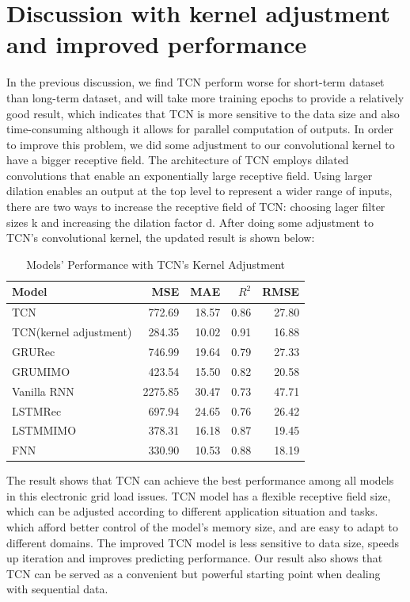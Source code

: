\section{Discussion with kernel adjustment and improved performance}
In the previous discussion, we find TCN perform worse for short-term dataset than long-term dataset, and will take more training epochs to provide a relatively good result, which indicates that TCN is more sensitive to the data size and also time-consuming although it allows for parallel computation of outputs. In order to improve this problem, we did some adjustment to our convolutional kernel to have a bigger receptive field. The architecture of TCN employs dilated convolutions that enable an exponentially large receptive field. Using larger dilation enables an output at the top level to represent a wider range of inputs, there are two ways to increase the receptive field of TCN: choosing lager filter sizes k and increasing the dilation factor d. After doing some adjustment to TCN's convolutional kernel, the updated result is shown below:

\begin{table}[H]
\centering
\caption{Models' Performance with TCN's Kernel Adjustment}
\begin{tabular}{l r r r r}
\toprule
\textbf{Model} & \textbf{MSE} & \textbf{MAE} & \textbf{$R^2$}& \textbf{RMSE}\\
\midrule
TCN & 772.69& 18.57& 0.86& 27.80\\
TCN(kernel adjustment) & 284.35 & 10.02 & \color{red}0.91& 16.88\\
GRU\-Rec & 746.99& 19.64& 0.79& 27.33 \\
GRU\-MIMO& 423.54& 15.50& 0.82& 20.58 \\
Vanilla RNN& 2275.85& 30.47& 0.73& 47.71 \\
LSTM\-Rec & 697.94& 24.65& 0.76& 26.42 \\
LSTM\-MIMO & 378.31& 16.18& 0.87& 19.45 \\
FNN & 330.90& 10.53& 0.88& 18.19 \\
\bottomrule
\end{tabular}
\label{tab:models}
\end{table}

The result shows that TCN can achieve the best performance among all models in this electronic grid load issues. TCN model has a flexible receptive field size, which can be adjusted according to different application situation and tasks. which afford better control of the model’s memory size, and are easy to adapt to different domains. The improved TCN model is less sensitive to data size, speeds up iteration and improves predicting performance. Our result also shows that TCN can be served as a convenient but powerful starting point when dealing with sequential data. 


